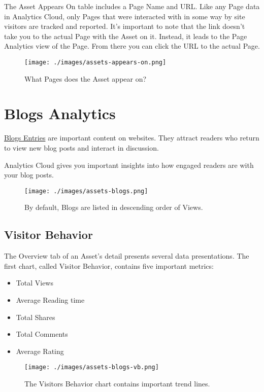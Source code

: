 The Asset Appears On table includes a Page Name and URL. Like any Page
data in Analytics Cloud, only Pages that were interacted with in some
way by site visitors are tracked and reported. It's important to note
that the link doesn't take you to the actual Page with the Asset on it.
Instead, it leads to the Page Analytics view of the Page. From there you
can click the URL to the actual Page.

\begin{figure}
\centering
\texttt{[image: ./images/assets-appears-on.png]}
\caption{What Pages does the Asset appear on?}
\end{figure}

\section{Blogs Analytics}\label{blogs-analytics}

\href{/docs/7-1/user/-/knowledge_base/u/publishing-blogs}{Blogs Entries}
are important content on websites. They attract readers who return to
view new blog posts and interact in discussion.

Analytics Cloud gives you important insights into how engaged readers
are with your blog posts.

\begin{figure}
\centering
\texttt{[image: ./images/assets-blogs.png]}
\caption{By default, Blogs are listed in descending order of Views.}
\end{figure}

\subsection{Visitor Behavior}\label{visitor-behavior-2}

The Overview tab of an Asset's detail presents several data
presentations. The first chart, called Visitor Behavior, contains five
important metrics:

\begin{itemize}
\tightlist
\item
  Total Views
\item
  Average Reading time
\item
  Total Shares
\item
  Total Comments
\item
  Average Rating
\end{itemize}

\begin{figure}
\centering
\texttt{[image: ./images/assets-blogs-vb.png]}
\caption{The Visitors Behavior chart contains important trend lines.}
\end{figure}


